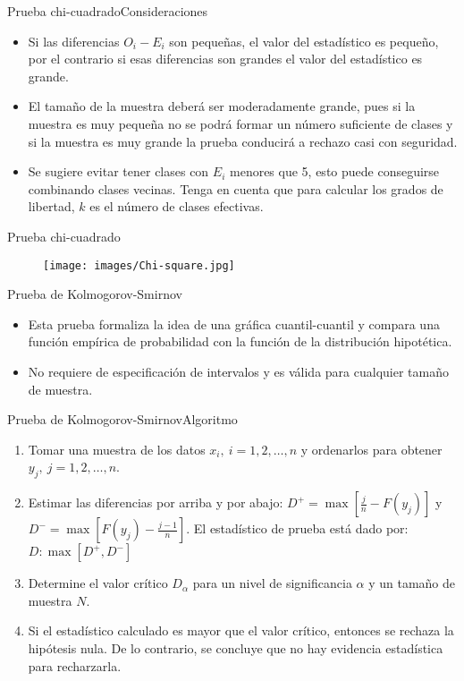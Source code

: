 \begin{frame}{Prueba chi-cuadrado}{Consideraciones}
    \begin{itemize}
        \item Si las diferencias $O_i-E_i$ son pequeñas, el valor del estadístico es pequeño, por el contrario si esas diferencias son grandes el valor del estadístico es grande.
        \item El tamaño de la muestra deberá ser moderadamente grande, pues si la muestra es muy pequeña no se podrá formar un número suficiente de clases y si la muestra es muy grande la prueba conducirá a rechazo casi con seguridad. 
        \item Se sugiere evitar tener clases con $E_i$ menores que 5, esto puede conseguirse combinando clases vecinas. Tenga en cuenta que para calcular los grados de libertad, $k$ es el número de clases efectivas.
    \end{itemize}
\end{frame}

\begin{frame}{Prueba chi-cuadrado}
    \begin{figure}
        \centering
        \texttt{[image: images/Chi-square.jpg]}
        \label{fig:chisquare}
    \end{figure}
\end{frame}
\begin{frame}{Prueba de Kolmogorov-Smirnov}
    \begin{itemize}
        \item Esta prueba formaliza la idea de una gráfica cuantil-cuantil y compara una función empírica de probabilidad con la función de la distribución hipotética. 
        \item No requiere de especificación de intervalos y es válida para cualquier tamaño de muestra.
    \end{itemize}
\end{frame}

\begin{frame}{Prueba de Kolmogorov-Smirnov}{Algoritmo}
    \begin{enumerate}
        \item Tomar una muestra de los datos $x_i,~i=1,2,\dots,n$ y ordenarlos para obtener $y_j,~j=1,2,\dots,n$.
        \item Estimar las diferencias por arriba y por abajo: $D^+=\max \left[ \frac{j}{n}-F(y_j)\right]$ y $D^-=\max \left[ F(y_j)-\frac{j-1}{n}\right]$. El estadístico de prueba está dado por: $D:\max \left[D^+,D^-\right]$
        \item Determine el valor crítico $D_\alpha$ para un nivel de significancia $\alpha$ y un tamaño de muestra $N$.
        \item Si el estadístico calculado es mayor que el valor crítico, entonces se rechaza la hipótesis nula. De lo contrario, se concluye que no hay evidencia estadística para recharzarla.
    \end{enumerate}
\end{frame}

